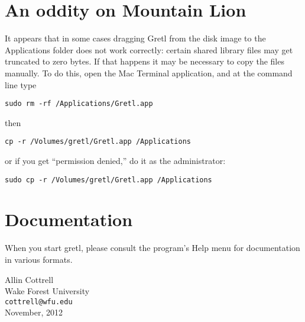 \documentclass[11pt]{article}
\begin{document}
\section{An oddity on Mountain Lion}

It appears that in some cases dragging \textsf{Gretl} from the disk
image to the \textsf{Applications} folder does not work correctly:
certain shared library files may get truncated to zero bytes. If that
happens it may be necessary to copy the files manually. To do this,
open the Mac Terminal application, and at the command line type

\begin{verbatim}
sudo rm -rf /Applications/Gretl.app
\end{verbatim}

then

\begin{verbatim}
cp -r /Volumes/gretl/Gretl.app /Applications
\end{verbatim}

or if you get ``permission denied,'' do it as the administrator:

\begin{verbatim}
sudo cp -r /Volumes/gretl/Gretl.app /Applications
\end{verbatim}

\section{Documentation}
\label{sec:doc}

When you start gretl, please consult the program's Help menu for
documentation in various formats.

\vspace{.25in}

\raggedright
Allin Cottrell \\
Wake Forest University \\
\texttt{cottrell@wfu.edu} \\
November, 2012
\end{document}
